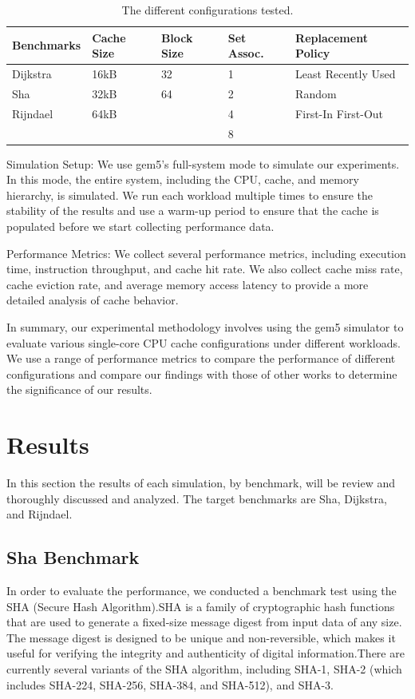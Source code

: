 \documentclass[conference]{IEEEtran}
\begin{document}
\begin{table}[H]
  \centering
  \begin{tabular}{| m{1.6cm} | m{.75cm} | m{.75cm} | m{.8cm} | m{2.6cm} |}
      \hline
      \textbf{Benchmarks} & \textbf{Cache Size} & \textbf{Block Size}& \textbf{Set Assoc.}& \textbf{Replacement Policy} \\ \hline
      Dijkstra    &   16kB  &   32    &  1   &    Least Recently Used     \\ \hline
      Sha         &   32kB  &   64    &  2   &    Random                  \\ \hline
      Rijndael    &   64kB  &         &  4   &    First-In First-Out      \\ \hline
                  &         &         &  8   &                            \\ \hline
  \end{tabular}
  \caption{The different configurations tested.}
  \label{table:configurations}
\end{table}

Simulation Setup:
We use gem5's full-system mode to simulate our experiments. In this mode, the entire system, including the CPU, cache, and memory hierarchy, is simulated. We run each workload multiple times to ensure the stability of the results and use a warm-up period to ensure that the cache is populated before we start collecting performance data.

Performance Metrics:
We collect several performance metrics, including execution time, instruction throughput, and cache hit rate. We also collect cache miss rate, cache eviction rate, and average memory access latency to provide a more detailed analysis of cache behavior.

In summary, our experimental methodology involves using the gem5 simulator to evaluate various single-core CPU cache configurations under different workloads. We use a range of performance metrics to compare the performance of different configurations and compare our findings with those of other works to determine the significance of our results.

\section{Results}
In this section the results of each simulation, by benchmark, will be review and thoroughly discussed and analyzed. The target benchmarks are Sha, Dijkstra, and Rijndael.

\subsection{Sha Benchmark}
In order to evaluate the performance, we conducted a benchmark test using the SHA (Secure Hash Algorithm).SHA is a family of cryptographic hash functions that are used to generate a fixed-size message digest from input data of any size. The message digest is designed to be unique and non-reversible, which makes it useful for verifying the integrity and authenticity of digital information.There are currently several variants of the SHA algorithm, including SHA-1, SHA-2 (which includes SHA-224, SHA-256, SHA-384, and SHA-512), and SHA-3.
\end{document}

